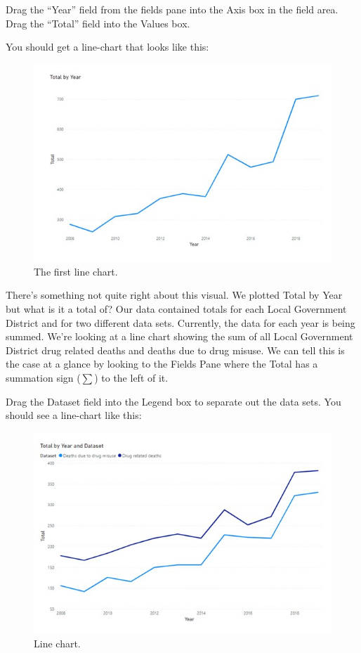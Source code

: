 \documentclass[
]{book}
\begin{document}
Drag the ``Year'' field from the fields pane into the Axis box in the field area. Drag the ``Total'' field into the Values box.

You should get a line-chart that looks like this:

\begin{figure}
\centering
\includegraphics{bi6.jpg}
\caption{The first line chart.}
\end{figure}

There's something not quite right about this visual. We plotted Total by Year but what is it a total of? Our data contained totals for each Local Government District and for two different data sets. Currently, the data for each year is being summed. We're looking at a line chart showing the sum of all Local Government District drug related deaths and deaths due to drug misuse. We can tell this is the case at a glance by looking to the Fields Pane where the Total has a summation sign (\(\sum\)) to the left of it.

Drag the Dataset field into the Legend box to separate out the data sets. You should see a line-chart like this:

\begin{figure}
\centering
\includegraphics{bi7.jpg}
\caption{Line chart.}
\end{figure}
\end{document}
